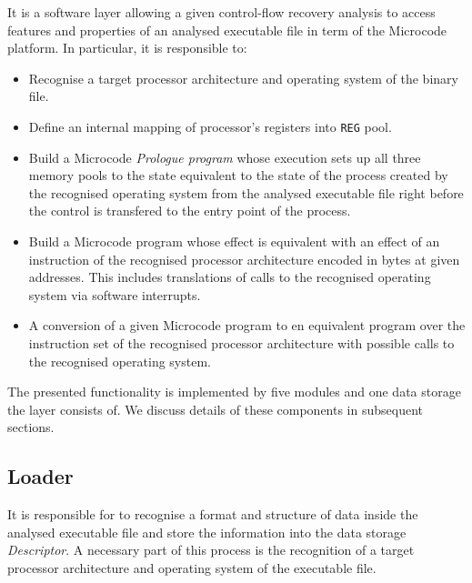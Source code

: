 \documentclass[10pt,twocolumn]{article}
\begin{document}
It is a software layer allowing a given control-flow recovery analysis to access
features and properties of an analysed executable file in term of the Microcode
platform. In particular, it is responsible to:
\begin{itemize}
\item Recognise a target processor architecture and operating system of the binary file.
%

\item Define an internal mapping of processor's registers into \texttt{REG}
pool. %

\item Build a Microcode \emph{Prologue program} whose execution sets up all
three memory pools to the state equivalent to the state of the process created
by the recognised operating system from the analysed executable file right
before the control is transfered to the entry point of the process. %

\item Build a Microcode program whose effect is equivalent with an effect of an
instruction of the recognised processor architecture encoded in bytes at given
addresses. This includes translations of calls to the recognised operating
system via software interrupts. %

\item A conversion of a given Microcode program to en equivalent program over the instruction set of the recognised processor architecture with possible calls to the recognised operating system.
%

\end{itemize}
The presented functionality is implemented by five modules and one data storage
the layer consists of. We discuss details of these components in subsequent
sections.

\subsection{Loader}
\label{sec:MAL:loader}

It is responsible for to recognise a format and structure of data inside the
analysed executable file and store the information into the data storage
\textit{Descriptor}. A necessary part of this process is the recognition of a
target processor architecture and operating system of the executable file.

\end{document}
